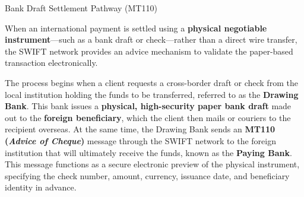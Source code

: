 \documentclass[10pt]{article}
\begin{document}
      \begin{core}{Bank Draft Settlement Pathway (MT110)}

        When an international payment is settled using a \textbf{physical negotiable instrument}---such as a bank draft or check---rather than a direct wire transfer, the SWIFT network provides an advice mechanism to validate the paper-based transaction electronically.

        The process begins when a client requests a cross-border draft or check from the local institution holding the funds to be transferred, referred to as the \textbf{Drawing Bank}. This bank issues a \textbf{physical, high-security paper bank draft} made out to the \textbf{foreign beneficiary}, which the client then mails or couriers to the recipient overseas. At the same time, the Drawing Bank sends an \textbf{MT110 (\textit{Advice of Cheque})} message through the SWIFT network to the foreign institution that will ultimately receive the funds, known as the \textbf{Paying Bank}. This message functions as a secure electronic preview of the physical instrument, specifying the check number, amount, currency, issuance date, and beneficiary identity in advance.

\end{core}
\end{document}
